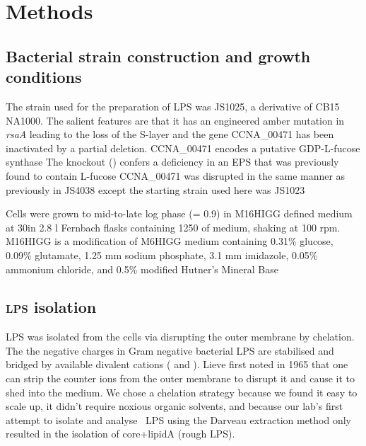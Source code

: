 \section{Methods} %
\label{sec:lps_methods}

	\subsection{Bacterial strain construction and growth conditions} %
	\label{sub:bacterial_strain_construction_and_growth_conditions}

  The strain used for the preparation of \ac{LPS} was JS1025, a derivative of \caulobacter CB15
  NA1000. The salient features are that it has an engineered amber mutation in \textit{rsaA} leading
  to the loss of the \ac{S-layer} and the gene CCNA\_00471 has been inactivated by a partial
  deletion. CCNA\_00471 encodes a putative GDP-L-fucose synthase The
  knockout () confers a deficiency in an \ac{EPS} that was previously found to contain
  L-fucose CCNA\_00471 was disrupted in the same manner as previously in
  JS4038 except the starting strain used here was
  JS1023
		
  Cells were grown to mid-to-late log phase (\od = 0.9) in M16HIGG defined medium at 30\cel in 2.8
  \si{\litre} Fernbach flasks containing 1250 \millilitre of medium, shaking at 100 rpm. M16HIGG is
  a modification of M6HIGG medium containing 0.31\% glucose, 0.09\%
  glutamate, 1.25 \si{\milli\meter} sodium phosphate, 3.1 \si{\milli\meter} imidazole, 0.05\%
  ammonium chloride, and 0.5\% modified Hutner's Mineral Base

	\subsection{\textsc{lps} isolation} %
	\label{sub:LPS_isolation}
  \ac{LPS} was isolated from the cells via disrupting the outer membrane by chelation.  The the
  negative charges in Gram negative bacterial \ac{LPS} are stabilised and bridged by available
  divalent cations (\ie{}  and ). Lieve first noted in 1965 that
  one can strip the counter ions from the outer membrane to disrupt it and cause it to shed into the
  medium. We chose a chelation strategy because we found it easy to scale up, it didn't require
  noxious organic solvents, and because our lab's first attempt to isolate and analyse \caulobacter\
  \ac{LPS} using the Darveau extraction method only
  resulted in the isolation of core+lipidA (rough \ac{LPS}).

